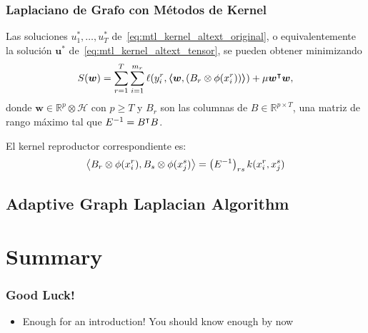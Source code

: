 \documentclass{beamer}
\newcommand{\opt}[1]{{#1}^*}
\newcommand{\upper}[1]{\expandafter\MakeUppercase\expandafter{#1}}
\newcommand{\mymat}[1]{\upper{#1}}
\newcommand{\myvec}[1]{\bm{#1}}
\newcommand{\fv}[1]{\myvec{#1}}
\newcommand{\dotp}[2]{\bm{\left\langle} #1, #2 \bm{\right\rangle}}
\newcommand{\ntasks}{T}
\newcommand{\npertask}{m}
\newcommand{\reals}{\mathbb{R}}
\newcommand{\hilbertspace}{\mathcal{H}}
\newcommand{\lossf}{\ell}
\begin{document}
\begin{frame}
      \frametitle{Laplaciano de Grafo con Métodos de Kernel}

      \begin{lemma}\label{lemma:regproblems_kernel}
            Las soluciones $u_1^*, \ldots, u_\ntasks^*$ de~\eqref{eq:mtl_kernel_altext_original}, o equivalentemente la solución $\opt{\fv{u}}$ de~\eqref{eq:mtl_kernel_altext_tensor},    
            se pueden obtener minimizando
            \begin{equation}
                \label{eq:mtl_kernel_tensor}
                \begin{aligned}
                     & S(\myvec{w}) = \sum_{r=1}^{\ntasks} \sum_{i=1}^{\npertask_r} \lossf(y_i^r, \dotp{\myvec{w}}{(B_r \otimes \phi(x_i^r))}) + \mu  \myvec{w}^\intercal \myvec{w} , \\
                \end{aligned}
            \end{equation}
            donde $\bm{w} \in \reals^p \otimes \hilbertspace$ con $p \geq \ntasks$ y $B_r$ son las columnas de $B \in \reals^{p \times \ntasks}$, una matriz de rango máximo tal que $\mymat{E}^{-1} = \mymat{B}^\intercal \mymat{B}$.
        \end{lemma}
        El kernel reproductor correspondiente es:
        \begin{equation}
            \nonumber
            \dotp{B_r \otimes \phi(x_i^r)}{B_s \otimes \phi(x_j^s)} = \left(E^{-1} \right)_{rs} k(x_i^r, x_j^s) 
        \end{equation}



\end{frame}

\subsection{Adaptive Graph Laplacian Algorithm}


\section{Summary}

\begin{frame}
\frametitle{Good Luck!}
\begin{itemize}
\item Enough for an introduction! You should know enough by now
\end{itemize}
\end{frame}

\backmatter
\end{document}

